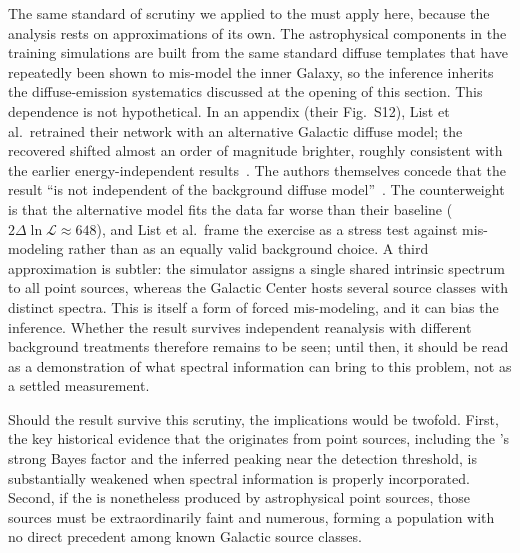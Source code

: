 The same standard of scrutiny we applied to the \NPTF must apply here, because the analysis rests on approximations of its own.
The astrophysical components in the training simulations are built from the same standard diffuse templates that have repeatedly been shown to mis-model the inner Galaxy, so the inference inherits the diffuse-emission systematics discussed at the opening of this section.
This dependence is not hypothetical.
In an appendix (their Fig.~S12), List et al.\ retrained their network with an alternative Galactic diffuse model; the recovered \SCD shifted almost an order of magnitude brighter, roughly consistent with the earlier energy-independent results~\cite{List:2020mzd}.
The authors themselves concede that the result ``is not independent of the background diffuse model''~\cite{List:2025qbx}.
The counterweight is that the alternative model fits the data far worse than their baseline ($2\Delta\ln\mathcal{L} \approx 648$), and List et al.\ frame the exercise as a stress test against mis-modeling rather than as an equally valid background choice.
A third approximation is subtler: the simulator assigns a single shared intrinsic spectrum to all point sources, whereas the Galactic Center hosts several source classes with distinct spectra.
This is itself a form of forced mis-modeling, and it can bias the inference.
Whether the result survives independent reanalysis with different background treatments therefore remains to be seen; until then, it should be read as a demonstration of what spectral information can bring to this problem, not as a settled measurement.

Should the result survive this scrutiny, the implications would be twofold.
First, the key historical evidence that the \GCE originates from point sources, including the \NPTF's strong Bayes factor and the inferred \SCD peaking near the detection threshold, is substantially weakened when spectral information is properly incorporated.
Second, if the \GCE is nonetheless produced by astrophysical point sources, those sources must be extraordinarily faint and numerous, forming a population with no direct precedent among known Galactic source classes.
